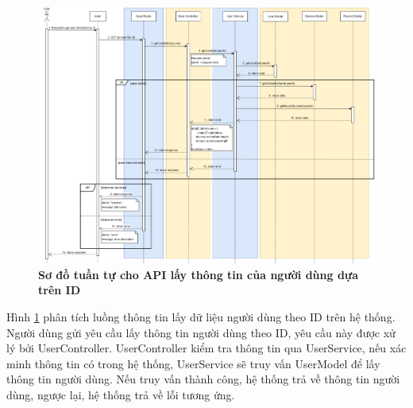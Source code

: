 \begin{figure}[H]
  \centering
  \includegraphics[scale=0.3]{Images/sequence_api/getUserById.png}
  \caption[Sơ đồ tuần tự cho API lấy thông tin của người dùng dựa trên ID ]{\bfseries \fontsize{12pt}{0pt}
  \selectfont Sơ đồ tuần tự cho API lấy thông tin của người dùng dựa trên ID }
  \label{api_getUserById} %
\end{figure}
Hình \ref{api_getUserById} phân tích luồng thông tin lấy dữ liệu người dùng theo ID trên hệ thống. Người dùng gửi yêu cầu lấy thông tin người dùng theo ID, yêu cầu này được xử lý bởi UserController. UserController kiểm tra thông tin qua UserService, nếu 
xác minh thông tin có trong hệ thống, UserService sẽ truy vấn UserModel để lấy thông tin người dùng. Nếu truy vấn thành công, hệ thống trả về thông tin người dùng, ngược lại, hệ thống trả về lỗi tương ứng.

